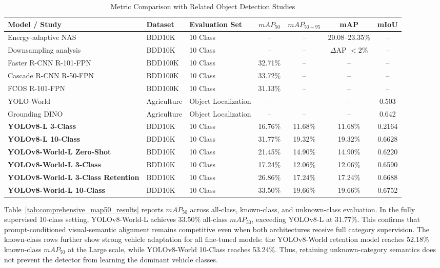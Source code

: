 \documentclass[conference]{IEEEtran}
\begin{document}
\begin{table}[htbp]
\caption{Metric Comparison with Related Object Detection Studies}
\begin{center}
\begin{tabular*}{\textwidth}{@{\extracolsep{\fill}}lllcccc}
\hline
\textbf{Model / Study} & \textbf{Dataset} & \textbf{Evaluation Set} & \textbf{$mAP_{50}$} & \textbf{$mAP_{50-95}$} & \textbf{mAP} & \textbf{mIoU} \\
\hline
Energy-adaptive NAS \cite{10605392} & BDD10K & 10 Class & -- & -- & 20.08--23.35\% & -- \\
Downsampling analysis \cite{11376542} & BDD10K & 10 Class & -- & -- & $\Delta$AP $<2\%$ & -- \\
Faster R-CNN R-101-FPN \cite{bdd100kModelZoo} & BDD100K & 10 Class & 32.71\% & -- & -- & -- \\
Cascade R-CNN R-50-FPN \cite{bdd100kModelZoo} & BDD100K & 10 Class & 33.72\% & -- & -- & -- \\
FCOS R-101-FPN \cite{bdd100kModelZoo} & BDD100K & 10 Class & 31.13\% & -- & -- & -- \\
YOLO-World \cite{agronomy14122830} & Agriculture & Object Localization & -- & -- & -- & 0.503 \\
Grounding DINO \cite{agronomy14122830} & Agriculture & Object Localization & -- & -- & -- & 0.642 \\
\textbf{YOLOv8-L 3-Class} & BDD10K & 10 Class & 16.76\% & 11.68\% & 11.68\% & 0.2164 \\
\textbf{YOLOv8-L 10-Class} & BDD10K & 10 Class & 31.77\% & 19.32\% & 19.32\% & 0.6628 \\
\textbf{YOLOv8-World-L Zero-Shot} & BDD10K & 10 Class & 21.45\% & 14.90\% & 14.90\% & 0.6220 \\
\textbf{YOLOv8-World-L 3-Class} & BDD10K & 10 Class & 17.24\% & 12.06\% & 12.06\% & 0.6590 \\
\textbf{YOLOv8-World-L 3-Class Retention} & BDD10K & 10 Class & 26.86\% & 17.24\% & 17.24\% & 0.6688 \\
\textbf{YOLOv8-World-L 10-Class} & BDD10K & 10 Class & 33.50\% & 19.66\% & 19.66\% & 0.6752 \\
\hline
\end{tabular*}
\label{tab:related_work_comparison}
\end{center}
\end{table}





Table~\ref{tab:comprehensive_map50_results} reports $mAP_{50}$ across all-class, known-class, and unknown-class evaluation. In the fully supervised 10-class setting, YOLOv8-World-L achieves 33.50\% all-class $mAP_{50}$, exceeding YOLOv8-L at 31.77\%. This confirms that prompt-conditioned visual-semantic alignment remains competitive even when both architectures receive full category supervision. The known-class rows further show strong vehicle adaptation for all fine-tuned models: the YOLOv8-World retention model reaches 52.18\% known-class $mAP_{50}$ at the Large scale, while YOLOv8-World 10-Class reaches 53.24\%. Thus, retaining unknown-category semantics does not prevent the detector from learning the dominant vehicle classes.
\end{document}
